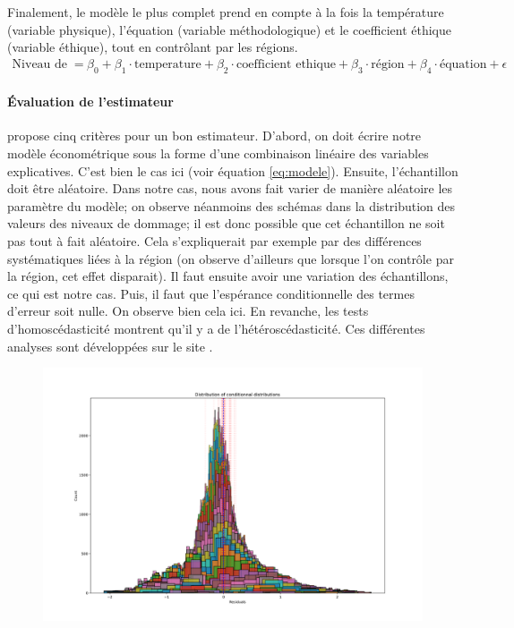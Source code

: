 Finalement, le modèle le plus complet prend en compte à la fois la température (variable physique), l'équation (variable méthodologique) et le coefficient éthique (variable éthique), tout en contrôlant par les régions. 
\begin{align}
\text{Niveau de dommage} = & \ \beta_0  + \beta_1 \cdot \text{temperature}  + \beta_2 \cdot \text{coefficient ethique} + \beta_3 \cdot \text{région} + \beta_4 \cdot \text{équation} + \epsilon
\end{align}
\paragraph{Évaluation de l'estimateur} \cite{wooldridge_introductory_2016} propose cinq critères pour un bon estimateur. D'abord, on doit écrire notre modèle économétrique sous la forme d'une combinaison linéaire des variables explicatives. C'est bien le cas ici (voir équation \ref{eq:modele}). Ensuite, l'échantillon doit être aléatoire. Dans notre cas, nous avons fait varier de manière aléatoire les paramètre du modèle; on observe néanmoins des schémas dans la distribution des valeurs des niveaux de dommage; il est donc possible que cet échantillon ne soit pas tout à fait aléatoire. Cela s'expliquerait par exemple par des différences systématiques liées à la région (on observe d'ailleurs que lorsque l'on contrôle par la région, cet effet disparait).  Il faut ensuite avoir une variation des échantillons, ce qui est notre cas. Puis, il faut que l'espérance conditionnelle des termes d'erreur soit nulle. On observe bien cela ici. En revanche, les tests d'homoscédasticité montrent qu'il y a de l'hétéroscédasticité.  Ces différentes analyses sont développées sur le site .

\begin{figure}
    \centering
    \includegraphics[width=\linewidth]{results/slr_4_2.png}
    \label{fig:slr_4}
\end{figure}


